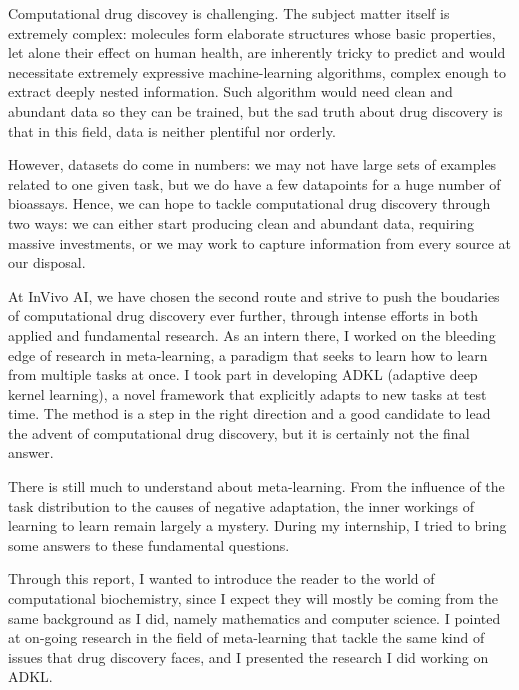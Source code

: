 \documentclass[11pt]{article}
\numberwithin{equation}{subsection}
\begin{document}
Computational drug discovey is challenging. The subject matter itself is extremely complex: molecules form elaborate structures whose basic properties, let alone their effect on human health, are inherently tricky to predict and would necessitate extremely expressive machine-learning algorithms, complex enough to extract deeply nested information. Such algorithm would need clean and abundant data so they can be trained, but the sad truth about drug discovery is that in this field, data is neither plentiful nor orderly.

However, datasets do come in numbers: we may not have large sets of examples related to one given task, but we do have a few datapoints for a huge number of bioassays. Hence, we can hope to tackle computational drug discovery through two ways: we can either start producing clean and abundant data, requiring massive investments, or we may work to capture information from every source at our disposal.

At InVivo AI, we have chosen the second route and strive to push the boudaries of computational drug discovery ever further, through intense efforts in both applied and fundamental research. As an intern there, I worked on the bleeding edge of research in meta-learning, a paradigm that seeks to learn how to learn from multiple tasks at once. I took part in developing ADKL (adaptive deep kernel learning), a novel framework that explicitly adapts to new tasks at test time. The method is a step in the right direction and a good candidate to lead the advent of computational drug discovery, but it is certainly not the final answer.

There is still much to understand about meta-learning. From the influence of the task distribution to the causes of negative adaptation, the inner workings of learning to learn remain largely a mystery. During my internship, I tried to bring some answers to these fundamental questions.

Through this report, I wanted to introduce the reader to the world of computational biochemistry, since I expect they will mostly be coming from the same background as I did, namely mathematics and computer science. I pointed at on-going research in the field of meta-learning that tackle the same kind of issues that drug discovery faces, and I presented the research I did working on ADKL.



\end{document}
